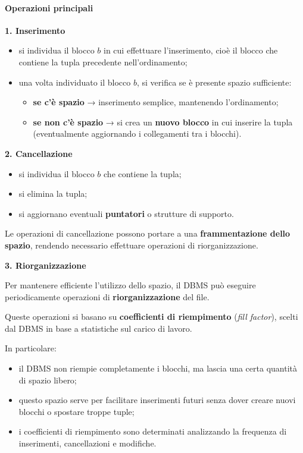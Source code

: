 \paragraph{Operazioni principali}
\textbf{1. Inserimento}

\begin{itemize}
	\item si individua il blocco $b$ in cui effettuare l'inserimento, cioè il blocco che contiene la tupla precedente nell'ordinamento;
	
	\item una volta individuato il blocco $b$, si verifica se è presente spazio sufficiente:
	
	\begin{itemize}
		\item \textbf{se c'è spazio} → inserimento semplice, mantenendo l'ordinamento;
		
		\item \textbf{se non c'è spazio} → si crea un \textbf{nuovo blocco} in cui inserire la tupla (eventualmente aggiornando i collegamenti tra i blocchi).
	\end{itemize}
\end{itemize}

\textbf{2. Cancellazione}

\begin{itemize}
	\item si individua il blocco $b$ che contiene la tupla;
	\item si elimina la tupla;
	\item si aggiornano eventuali \textbf{puntatori} o strutture di supporto.
\end{itemize}

Le operazioni di cancellazione possono portare a una \textbf{frammentazione dello spazio}, rendendo necessario effettuare operazioni di riorganizzazione.

\textbf{3. Riorganizzazione}

Per mantenere efficiente l'utilizzo dello spazio, il DBMS può eseguire periodicamente operazioni di \textbf{riorganizzazione} del file.

Queste operazioni si basano su \textbf{coefficienti di riempimento} (\textit{fill factor}), scelti dal DBMS in base a statistiche sul carico di lavoro.

In particolare:

\begin{itemize}
	\item il DBMS non riempie completamente i blocchi, ma lascia una certa quantità di spazio libero;
	\item questo spazio serve per facilitare inserimenti futuri senza dover creare nuovi blocchi o spostare troppe tuple;
	\item i coefficienti di riempimento sono determinati analizzando la frequenza di inserimenti, cancellazioni e modifiche.
\end{itemize}

